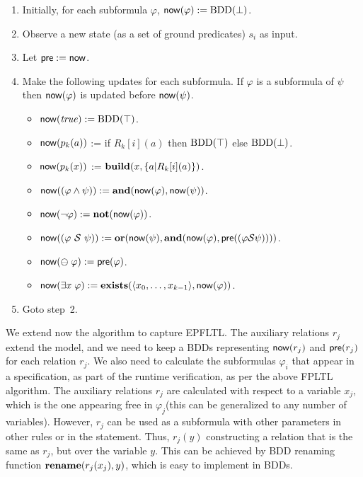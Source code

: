 \begin{enumerate}
\item Initially, for each subformula $\varphi$,
$\mathsf{now} ( \varphi ) := \mathrm{BDD}(\bot)$.
\item Observe a new state (as a set of ground predicates) $s_i$ as input. 
\item Let $\mathsf{pre} := \mathsf{now}$.
\item Make the following updates for each subformula. If $\varphi$ is
      a subformula of $\psi$ then $\mathsf{now} ( \varphi )$ is updated before 
      $\mathsf{now} ( \psi )$.
\begin{itemize}
  \item $\mathsf{now} ( \mathit{true} ) := \mathrm{BDD}(\top)$.
  \item $\mathsf{now} ( p_k ( a ) )$ := if $R_k [ i ] ( a )$ then
  $\mathrm{BDD}(\top)$ else $\mathrm{BDD}(\bot)$.
  \item $\mathsf{now} ( p_k ( x ) )$ :=
     $\mathbf{build} ( x ,  \{ a | R_k[i] ( a  ) \} )$.
  \item $\mathsf{now} ( ( \varphi \wedge \psi ) ) := 
  \mathbf{and} ( \mathsf{now} ( \varphi ) , \mathsf{now} ( \psi ))$.
  \item $\mathsf{now} ( \neg \varphi  ) := \mathbf{not} ( \mathsf{now} ( \varphi ))$.
  \item $\mathsf{now} ( ( \varphi\ {\cal S}\ \psi ) ) := \\ 
  \mathbf{or} ( \mathsf{now} ( \psi  ) , \mathbf{and} ( \mathsf{now} ( \varphi ) ,
      \mathsf{pre} ( ( \varphi {\cal S}  \psi ))))$.
  \item $\mathsf{now} ( \ominus \; \varphi ) := \mathsf{pre} ( \varphi )$.
  \item $\mathsf{now} ( \exists x \; \varphi ) := 
  \mathbf{exists} (\langle x_0,\ldots,x_{k-1} \rangle, \mathsf{now} ( \varphi ))$.
\end{itemize}
\item Goto step~2.
\end{enumerate}

We extend now the algorithm to capture EPFLTL.
The auxiliary relations $r_j$ extend the model, and we need to keep 
a BDDs representing $\mathsf{now} ( r_j )$ and
$\mathsf{pre} (r_j)$ for each relation $r_j$. We also need to calculate the subformulas $\varphi_i$ that appear in
a specification, as part of the runtime verification,
as per the above FPLTL algorithm. The auxiliary relations $r_j$ are calculated with respect to
a variable $x_j$, which is the one appearing
free in $\varphi_j$(this can be generalized to any number of variables). However, $r_j$ can be used
as a subformula with other parameters in other rules or in the statement. Thus,
$r_j ( y )$ constructing a relation
that is the same as $r_j$, but over the variable $y$. This can be achieved by BDD renaming function $\mathbf{rename} ( r_j (x_j ) , y)$, which is easy to implement in BDDs.


